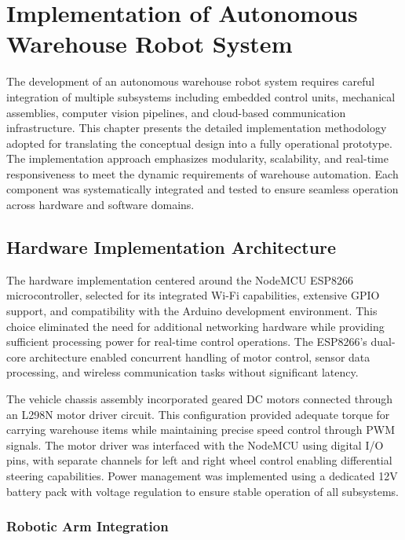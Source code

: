 \chapter{Implementation of Autonomous Warehouse Robot System}

The development of an autonomous warehouse robot system requires careful integration of multiple subsystems including embedded control units, mechanical assemblies, computer vision pipelines, and cloud-based communication infrastructure. This chapter presents the detailed implementation methodology adopted for translating the conceptual design into a fully operational prototype. The implementation approach emphasizes modularity, scalability, and real-time responsiveness to meet the dynamic requirements of warehouse automation. Each component was systematically integrated and tested to ensure seamless operation across hardware and software domains.

\section{Hardware Implementation Architecture}

The hardware implementation centered around the NodeMCU ESP8266 microcontroller, selected for its integrated Wi-Fi capabilities, extensive GPIO support, and compatibility with the Arduino development environment. This choice eliminated the need for additional networking hardware while providing sufficient processing power for real-time control operations. The ESP8266's dual-core architecture enabled concurrent handling of motor control, sensor data processing, and wireless communication tasks without significant latency.

The vehicle chassis assembly incorporated geared DC motors connected through an L298N motor driver circuit. This configuration provided adequate torque for carrying warehouse items while maintaining precise speed control through PWM signals. The motor driver was interfaced with the NodeMCU using digital I/O pins, with separate channels for left and right wheel control enabling differential steering capabilities. Power management was implemented using a dedicated 12V battery pack with voltage regulation to ensure stable operation of all subsystems.

\subsection{Robotic Arm Integration}


